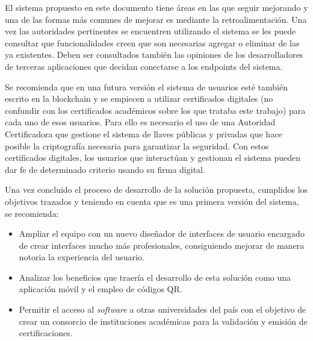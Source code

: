 \begin{recomendations}
El sistema propuesto en este documento tiene áreas en las que seguir mejorando y una de las formas más comunes de mejorar es mediante la retroalimentación. Una vez las autoridades pertinentes se encuentren utilizando el sistema se les puede consultar que funcionalidades creen que son necesarias agregar o eliminar de las ya existentes. Deben ser consultados también las opiniones de los desarrolladores de terceras aplicaciones que decidan conectarse a los endpoints del sistema.

Se recomienda que en una futura versión el sistema de usuarios esté también escrito en la blockchain y se empiecen a utilizar certificados digitales (no confundir con los certificados académicos sobre los que trataba este trabajo) para cada uno de esos usuarios. Para ello es necesario el uso de una Autoridad Certificadora que gestione el sistema de llaves públicas y privadas que hace posible la criptografía necesaria para garantizar la seguridad. Con estos certificados digitales, los usuarios que interactúan y gestionan el sistema pueden dar fe de determinado criterio usando su firma digital.


Una vez concluido el proceso de desarrollo de la solución propuesta, cumplidos los objetivos trazados y teniendo en cuenta que es una primera versión del sistema, se recomienda:
\begin{itemize}
  	\item Ampliar el equipo con un nuevo diseñador de interfaces de usuario encargado de crear interfaces mucho más profesionales, consiguiendo mejorar de manera notoria la experiencia del usuario.
   	\item Analizar los beneficios que traería el desarrollo de esta solución como una aplicación móvil y el empleo de códigos QR.
    \item Permitir el acceso al \textit{software} a otras universidades del país con el objetivo de crear un consorcio de instituciones académicas para la validación y emisión de certificaciones.
\end{itemize}
    
\end{recomendations}
